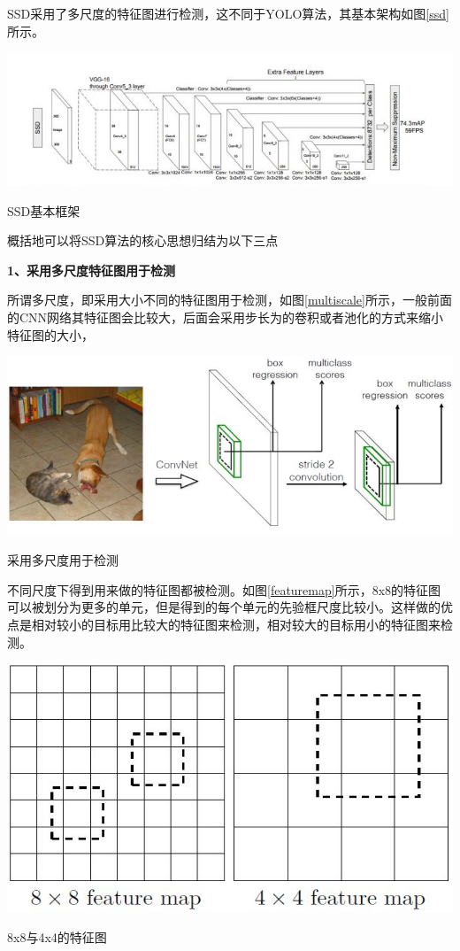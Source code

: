 SSD采用了多尺度的特征图进行检测，这不同于YOLO算法，其基本架构如图\ref{ssd}所示。
\begin{uscfigure}
	\includegraphics[width=\textwidth]{./Pictures/ssd_model.jpg}	
	\caption{SSD基本框架}
	\label{ssd}
\end{uscfigure}


概括地可以将SSD算法的核心思想归结为以下三点

\textbf{1、采用多尺度特征图用于检测 }

所谓多尺度，即采用大小不同的特征图用于检测，如图\ref{multiscale}所示，一般前面的CNN网络其特征图会比较大，后面会采用步长为的卷积或者池化的方式来缩小特征图的大小，
\begin{uscfigure}
	\includegraphics[width=\textwidth]{./Pictures/ssd_(1).jpg}	
	\caption{采用多尺度用于检测}
	\label{multiscale}
\end{uscfigure}
不同尺度下得到用来做的特征图都被检测。如图\ref{featuremap}所示，8x8的特征图可以被划分为更多的单元，但是得到的每个单元的先验框尺度比较小。这样做的优点是相对较小的目标用比较大的特征图来检测，相对较大的目标用小的特征图来检测。
\begin{uscfigure}
	\includegraphics[width=\textwidth]{./Pictures/ssd_(2).jpg}	
	\caption{8x8与4x4的特征图}
	\label{featuremap}
\end{uscfigure}

